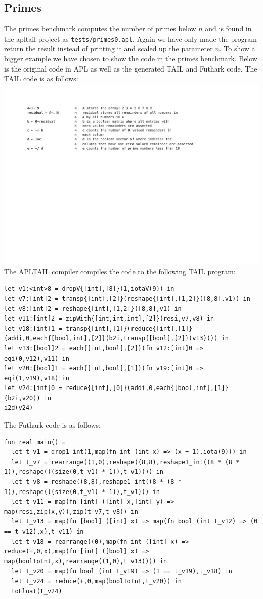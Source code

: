 \documentclass[11pt]{article}
\begin{document}
\subsection{Primes}
The primes benchmark computes the number of primes below $n$ and is found in the apltail project as {\tt tests/primes0.apl}.
Again we have only made the program return the result instead of printing it and scaled up the parameter $n$.
To show a bigger example we have chosen to show the code in the primes benchmark. Below is the original code in APL as well as the generated TAIL and Futhark code.
The TAIL code is as follows:
\includegraphics[scale=0.7,trim=6em 36em 10em 6em,clip=true]{primes.pdf}
The APLTAIL compiler compiles the code to the following TAIL program:
\begin{lstlisting}[breaklines=true,language=TAIL]
let v1:<int>8 = dropV{[int],[8]}(1,iotaV(9)) in
let v7:[int]2 = transp{[int],[2]}(reshape{[int],[1,2]}([8,8],v1)) in
let v8:[int]2 = reshape{[int],[1,2]}([8,8],v1) in
let v11:[int]2 = zipWith{[int,int,int],[2]}(resi,v7,v8) in
let v18:[int]1 = transp{[int],[1]}(reduce{[int],[1]}(addi,0,each{[bool,int],[2]}(b2i,transp{[bool],[2]}(v13)))) in
let v13:[bool]2 = each{[int,bool],[2]}(fn v12:[int]0 => eqi(0,v12),v11) in
let v20:[bool]1 = each{[int,bool],[1]}(fn v19:[int]0 => eqi(1,v19),v18) in
let v24:[int]0 = reduce{[int],[0]}(addi,0,each{[bool,int],[1]}(b2i,v20)) in
i2d(v24)
\end{lstlisting}

The Futhark code is as follows:
\begin{lstlisting}[language=Futhark,breaklines=true]
fun real main() =
  let t_v1 = drop1_int(1,map(fn int (int x) => (x + 1),iota(9))) in
  let t_v7 = rearrange((1,0),reshape((8,8),reshape1_int((8 * (8 * 1)),reshape(((size(0,t_v1) * 1)),t_v1)))) in
  let t_v8 = reshape((8,8),reshape1_int((8 * (8 * 1)),reshape(((size(0,t_v1) * 1)),t_v1))) in
  let t_v11 = map(fn [int] ([int] x,[int] y) => map(resi,zip(x,y)),zip(t_v7,t_v8)) in
  let t_v13 = map(fn [bool] ([int] x) => map(fn bool (int t_v12) => (0 == t_v12),x),t_v11) in
  let t_v18 = rearrange((0),map(fn int ([int] x) => reduce(+,0,x),map(fn [int] ([bool] x) => map(boolToInt,x),rearrange((1,0),t_v13)))) in
  let t_v20 = map(fn bool (int t_v19) => (1 == t_v19),t_v18) in
  let t_v24 = reduce(+,0,map(boolToInt,t_v20)) in
  toFloat(t_v24)
\end{lstlisting}
\end{document}
